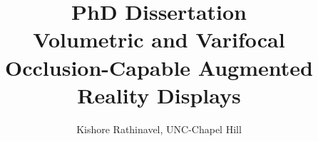 \documentclass[11pt,letterpaper]{report}
\begin{document}
\setlength{\droptitle}{-4em}
\title{PhD Dissertation \\ 
Volumetric and Varifocal Occlusion-Capable Augmented Reality Displays}
\author{Kishore Rathinavel, UNC-Chapel Hill}
\date{\vspace{-1ex}}
\maketitle

\tableofcontents


\printbibliography
\end{document}
